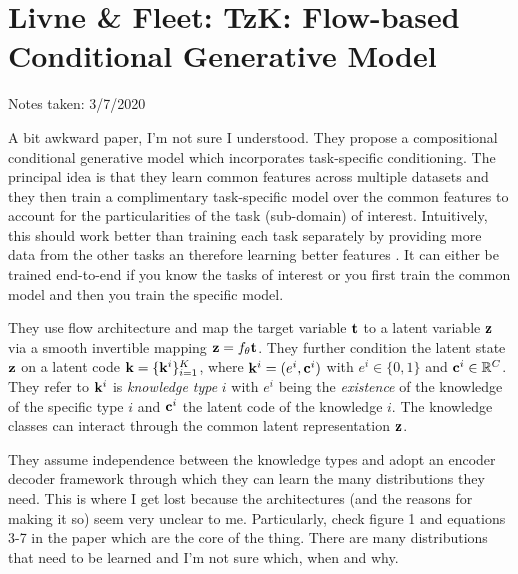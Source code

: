 \clearpage 

\section{Livne \& Fleet: TzK: Flow-based Conditional Generative Model}\label{sec:TzK}

\begin{notebox}

\hfill Notes taken: 3/7/2020 
\end{notebox}

A bit awkward paper, I'm not sure I understood.
They propose a compositional conditional generative model which incorporates task-specific conditioning.
The principal idea is that they learn common features across multiple datasets and they then train a complimentary task-specific model over the common features to account for the particularities of the task (sub-domain) of interest.
Intuitively, this should work better than training each task separately by providing more data from the other tasks an therefore learning better features .
It can either be trained end-to-end if you know the tasks of interest or you first train the common model and then you train the specific model. \\

They use flow architecture and map the target variable $\mathbf{t}$ to a latent variable $\mathbf{z}$ via a smooth invertible mapping $\mathbf{z} = f_\theta{\mathbf{t}}$.
They further condition the latent state $\mathbf{z}$ on a latent code $\mathbf{k} = \{\mathbf{k}^i\}_{i=1}^K$, where $\mathbf{k}^i = (e^i, \mathbf{c}^i)$ with $e^i \in  \{0, 1\}$ and $\mathbf{c}^i \in \mathbb{R}^C$.
They refer to $\mathbf{k}^i$ is \emph{knowledge type} $i$ with $e^i$ being the \emph{existence} of the knowledge of the specific type $i$ and $\mathbf{c}^i$ the latent code of the knowledge $i$.
The knowledge classes can interact through the common latent representation $\mathbf{z}$.

They assume independence between the knowledge types and adopt an encoder decoder framework through which they can learn the many distributions they need.
This is where I get lost because the architectures (and the reasons for making it so) seem very unclear to me.
Particularly, check figure 1 and equations 3-7 in the paper which are the core of the thing. There are many distributions that need to be learned and I'm not sure which, when and why.







